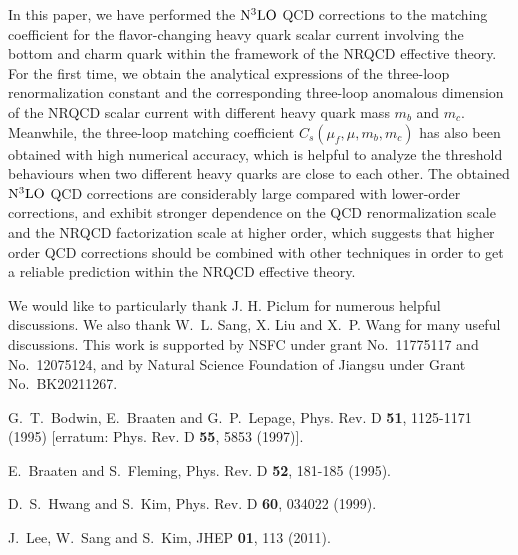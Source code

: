 \documentclass[onecolumn,preprintnumbers,aps,superscriptaddress,nofootinbib,prd,notitlepage]{revtex4-1}
\begin{document}
{In this paper, we have performed  the $\rm N^3LO$ QCD corrections to the matching coefficient for the flavor-changing heavy quark scalar current  involving the bottom and charm quark
within the framework of the NRQCD effective theory.
For the first time, we obtain the analytical expressions of the three-loop renormalization constant and the corresponding three-loop anomalous dimension of the NRQCD scalar current
with different heavy quark mass $m_b$ and $m_c$.
Meanwhile, the three-loop matching coefficient $C_s(\mu_f,\mu,m_b,m_c)$ has also been obtained with high numerical accuracy, which  is helpful to analyze the threshold behaviours when two different heavy quarks
are close to each other.
The obtained $\rm N^3LO$ QCD  corrections are considerably large compared with lower-order corrections, and  exhibit
stronger dependence on the QCD renormalization scale and the NRQCD factorization scale at higher order, which suggests that   higher   order  QCD  corrections  should  be   combined   with  other techniques in order to get a  reliable prediction within the NRQCD  effective theory.


\begin{acknowledgments}

We would like to particularly thank J. H. Piclum for numerous helpful discussions. We also thank W.~L. Sang, X. Liu and X.~P. Wang for many useful discussions. This work is supported by NSFC under grant No.~11775117 and No.~12075124,  and by Natural Science Foundation of Jiangsu under Grant No.~BK20211267.

\end{acknowledgments}


\begin{thebibliography}{99}


G.~T.~Bodwin, E.~Braaten and G.~P.~Lepage,
Phys. Rev. D \textbf{51}, 1125-1171 (1995) [erratum: Phys. Rev. D \textbf{55}, 5853 (1997)].

E.~Braaten and S.~Fleming,
Phys. Rev. D \textbf{52}, 181-185 (1995).

D.~S.~Hwang and S.~Kim,
Phys. Rev. D \textbf{60}, 034022 (1999).

J.~Lee, W.~Sang and S.~Kim,
JHEP \textbf{01}, 113 (2011).


\end{thebibliography}}
\end{document}
